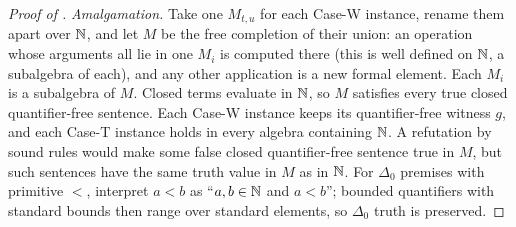 \begin{proof}[Proof of ]
\emph{Amalgamation.} Take one $M_{t,u}$ for each Case-W instance, rename them apart over $\mathbb{N}$, and let $M$ be the free
completion of their union: an operation whose arguments all lie in one $M_i$ is computed there (this is well defined on
$\mathbb{N}$, a subalgebra of each), and any other application is a new formal element. Each $M_i$ is a subalgebra of $M$.
Closed terms evaluate in $\mathbb{N}$, so $M$ satisfies every true closed quantifier-free sentence. Each Case-W instance keeps its
quantifier-free witness $g$, and each Case-T instance holds in every algebra containing $\mathbb{N}$. A refutation by sound rules
would make some false closed quantifier-free sentence true in $M$, but such sentences have the same truth value in $M$ as
in $\mathbb{N}$. For $\Delta_0$ premises with primitive $<$, interpret $a<b$ as ``$a,b\in\mathbb{N}$ and $a<b$''; bounded quantifiers
with standard bounds then range over standard elements, so $\Delta_0$ truth is preserved.
\end{proof}

